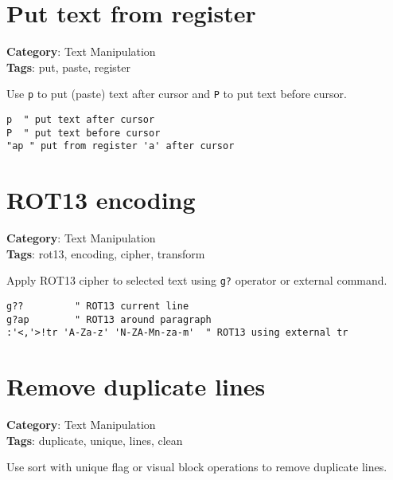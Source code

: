 {{{{{{{{{{{{{{\section{Put text from register}

\textbf{Category}: Text Manipulation\\ \textbf{Tags}: put, paste, register
\vspace{0.5cm}

Use {\footnotesize \Verb§p§} to put (paste) text after cursor and {\footnotesize \Verb§P§} to put text before cursor.

\begin{Exa*}{}
\begin{Verbatim}[fontsize=\footnotesize, breaklines, breakanywhere]
p  " put text after cursor
P  " put text before cursor
"ap " put from register 'a' after cursor
\end{Verbatim}
\end{Exa*}

\section{ROT13 encoding}

\textbf{Category}: Text Manipulation\\ \textbf{Tags}: rot13, encoding, cipher, transform
\vspace{0.5cm}

Apply ROT13 cipher to selected text using {\footnotesize \Verb§g?§} operator or external command.

\begin{Exa*}{}
\begin{Verbatim}[fontsize=\footnotesize, breaklines, breakanywhere]
g??         " ROT13 current line
g?ap        " ROT13 around paragraph
:'<,'>!tr 'A-Za-z' 'N-ZA-Mn-za-m'  " ROT13 using external tr
\end{Verbatim}
\end{Exa*}

\section{Remove duplicate lines}

\textbf{Category}: Text Manipulation\\ \textbf{Tags}: duplicate, unique, lines, clean
\vspace{0.5cm}

Use sort with unique flag or visual block operations to remove duplicate lines.

}}}}}}}}}}}}}}

